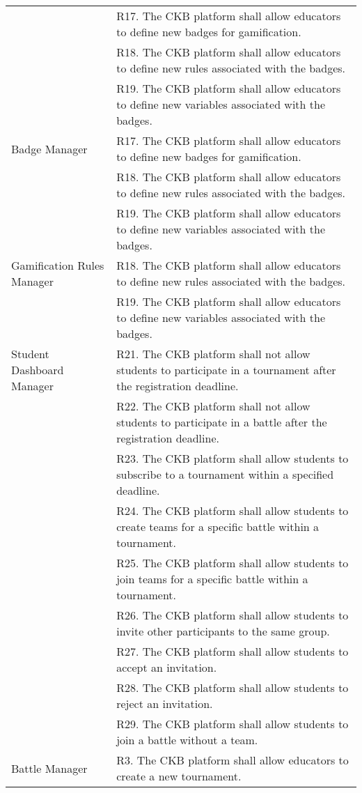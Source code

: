 \begin{center}
\begin{longtable}{p{0.3\linewidth}p{0.7\linewidth}}
        & R17. The CKB platform shall allow educators to define new badges for gamification. \\
        & R18. The CKB platform shall allow educators to define new rules associated with the badges. \\
        & R19. The CKB platform shall allow educators to define new variables associated with the badges. \\
        \hline
        Badge Manager & R17. The CKB platform shall allow educators to define new badges for gamification. \\
        & R18. The CKB platform shall allow educators to define new rules associated with the badges. \\
        & R19. The CKB platform shall allow educators to define new variables associated with the badges. \\
        \hline
        Gamification Rules Manager & R18. The CKB platform shall allow educators to define new rules associated with the badges. \\
        & R19. The CKB platform shall allow educators to define new variables associated with the badges. \\
        \hline
        Student Dashboard Manager & R21. The CKB platform shall not allow students to participate in a tournament after the registration deadline. \\
        & R22. The CKB platform shall not allow students to participate in a battle after the registration deadline. \\
        & R23. The CKB platform shall allow students to subscribe to a tournament within a specified deadline. \\
        & R24. The CKB platform shall allow students to create teams for a specific battle within a tournament. \\
        & R25. The CKB platform shall allow students to join teams for a specific battle within a tournament. \\
        & R26. The CKB platform shall allow students to invite other participants to the same group. \\
        & R27. The CKB platform shall allow students to accept an invitation. \\
        & R28. The CKB platform shall allow students to reject an invitation. \\
        & R29. The CKB platform shall allow students to join a battle without a team. \\
        \hline
        Battle Manager & R3. The CKB platform shall allow educators to create a new tournament. \\

\end{longtable}
\end{center}
